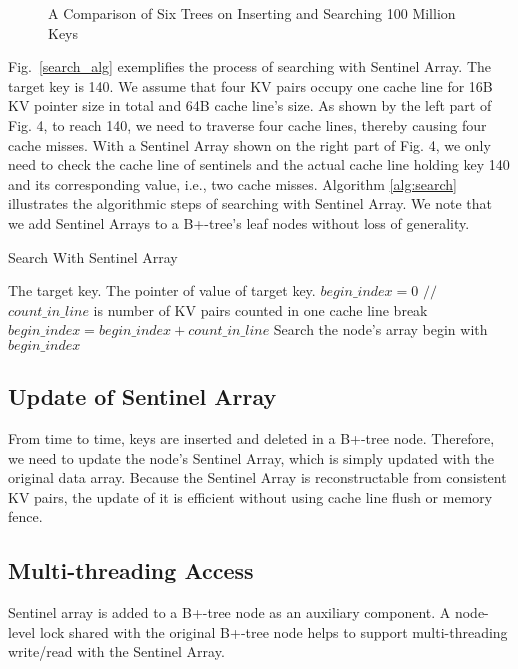 \begin{figure}[t]
	\centering
	\centering
	\caption{A Comparison of Six Trees on Inserting and Searching 100 Million Keys}
	\label{100m_testing} 
\end{figure}

Fig.~\ref{search_alg} exemplifies the process of searching with Sentinel Array. The target key is 140. We assume that four KV pairs occupy one cache line for 16B KV pointer size in total and 64B cache line's size.  As shown by the left part of Fig. 4, to reach 140, we need to traverse four cache lines, thereby causing four cache misses. With a Sentinel Array shown on the right part of Fig. 4, we only need to check the cache line of sentinels and the actual cache line holding key 140 and its corresponding value, i.e., two cache misses. Algorithm \ref{alg:search} illustrates the algorithmic steps of searching with Sentinel Array. We note that we add Sentinel Arrays to a B+-tree's leaf nodes without loss of generality.

\begin{algorithm}[!htbp]
    \caption{Search With Sentinel Array}
    \label{alg:search}
    \begin{algorithmic}[1]
        \REQUIRE The target key.
        \ENSURE The pointer of value of target key.
        \STATE $begin\_index = 0$
            \STATE $//$ $count\_in\_line$ is number of KV pairs counted in one cache line
                \STATE break
            \ENDIF
            \STATE $begin\_index = begin\_index + count\_in\_line$
        \ENDFOR
        \STATE Search the node's array begin with $begin\_index$
    \end{algorithmic}
\end{algorithm}


\subsection{Update of Sentinel Array}
From time to time, keys are inserted and deleted in a B+-tree node. Therefore, we need to update the node's Sentinel Array, which is simply updated with the original data array.  Because the Sentinel Array is reconstructable from consistent KV pairs, the update of it is efficient without using cache line flush or memory fence.

\subsection{Multi-threading Access}

Sentinel array is added to a B+-tree node as an auxiliary component. A node-level lock shared with the original B+-tree node helps to support multi-threading write/read with the Sentinel Array.
